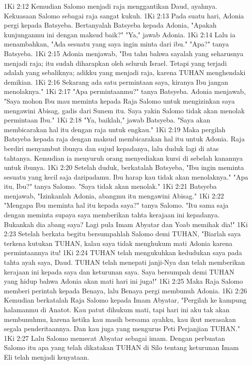 1Ki 2:12  Kemudian Salomo menjadi raja menggantikan Daud, ayahnya. Kekuasaan Salomo sebagai raja sangat kukuh.
1Ki 2:13  Pada suatu hari, Adonia pergi kepada Batsyeba. Bertanyalah Batsyeba kepada Adonia, "Apakah kunjunganmu ini dengan maksud baik?" "Ya," jawab Adonia.
1Ki 2:14  Lalu ia menambahkan, "Ada sesuatu yang saya ingin minta dari ibu." "Apa?" tanya Batsyeba.
1Ki 2:15  Adonia menjawab, "Ibu tahu bahwa sayalah yang seharusnya menjadi raja; itu sudah diharapkan oleh seluruh Israel. Tetapi yang terjadi adalah yang sebaliknya; adikku yang menjadi raja, karena TUHAN menghendaki demikian.
1Ki 2:16  Sekarang ada satu permintaan saya, kiranya Ibu jangan menolaknya."
1Ki 2:17  "Apa permintaanmu?" tanya Batsyeba. Adonia menjawab, "Saya mohon Ibu mau meminta kepada Raja Salomo untuk mengizinkan saya mengawini Abisag, gadis dari Sunem itu. Saya yakin Salomo tidak akan menolak permintaan Ibu."
1Ki 2:18  "Ya, baiklah," jawab Batsyeba. "Saya akan membicarakan hal itu dengan raja untuk engkau."
1Ki 2:19  Maka pergilah Batsyeba kepada raja dengan maksud membicarakan hal itu untuk Adonia. Raja berdiri menyambut ibunya dan sujud kepadanya, lalu duduk lagi di atas tahtanya. Kemudian ia menyuruh orang menyediakan kursi di sebelah kanannya untuk ibunya.
1Ki 2:20  Setelah duduk, berkatalah Batsyeba, "Ibu ingin meminta sesuatu yang kecil saja daripadamu. Ibu harap kau tidak akan menolaknya." "Apa itu, Ibu?" tanya Salomo. "Saya tidak akan menolak."
1Ki 2:21  Batsyeba menjawab, "Izinkanlah Adonia, abangmu itu mengawini Abisag."
1Ki 2:22  "Mengapa Ibu meminta hal itu kepada saya?" tanya Salomo. "Itu sama saja dengan meminta supaya saya memberikan tahta kerajaan ini kepadanya. Bukankah dia abang saya? Lagi pula Imam Abyatar dan Yoab memihak dia!"
1Ki 2:23  Setelah berkata begitu bersumpahlah Salomo demi TUHAN, "Biarlah saya terkena kutukan TUHAN, kalau saya tidak menghukum mati Adonia karena permintaannya itu!
1Ki 2:24  TUHAN telah mengukuhkan kedudukan saya pada tahta ayah saya, Daud. TUHAN telah menepati janji-Nya dan telah memberikan kerajaan ini kepada saya dan keturunan saya. Saya bersumpah demi TUHAN yang hidup bahwa Adonia akan mati hari ini juga!"
1Ki 2:25  Maka Raja Salomo memberi perintah kepada Benaya, lalu Benaya pergi membunuh Adonia.
1Ki 2:26  Kemudian berkatalah Raja Salomo kepada Imam Abyatar, "Pergilah ke kampung halamanmu di Anatot. Kau patut dihukum mati, tapi hari ini aku tak akan membunuhmu, karena ketika kau masih bersama ayahku, kau ikut merasakan segala penderitaannya. Dan kau juga yang mengurus Peti Perjanjian TUHAN."
1Ki 2:27  Lalu Salomo memecat Abyatar sebagai imam. Dengan perbuatan Salomo itu apa yang telah dikatakan TUHAN di Silo tentang keturunan Imam Eli telah menjadi kenyataan.
